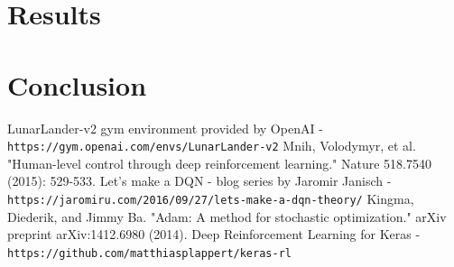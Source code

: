 \documentclass{article}
\begin{document}
\section{Results}
\section{Conclusion}
\begin{thebibliography}{}
LunarLander-v2 gym environment provided by OpenAI - \texttt{https://gym.openai.com/envs/LunarLander-v2}
Mnih, Volodymyr, et al. "Human-level control through deep reinforcement learning." Nature 518.7540 (2015): 529-533.
Let’s make a DQN - blog series by Jaromir Janisch - \texttt{https://jaromiru.com/2016/09/27/lets-make-a-dqn-theory/}
Kingma, Diederik, and Jimmy Ba. "Adam: A method for stochastic optimization." arXiv preprint arXiv:1412.6980 (2014).
Deep Reinforcement Learning for Keras - \texttt{https://github.com/matthiasplappert/keras-rl}
\end{thebibliography}
\end{document}
